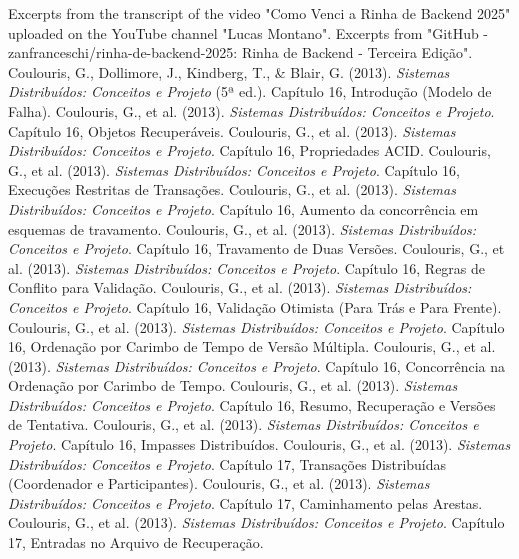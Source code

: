 \documentclass[12pt, a4paper]{article}
\begin{document}
\newpage
\begin{thebibliography}{99}
 Excerpts from the transcript of the video "Como Venci a Rinha de Backend 2025" uploaded on the YouTube channel "Lucas Montano".
 Excerpts from "GitHub - zanfranceschi/rinha-de-backend-2025: Rinha de Backend - Terceira Edição".
 Coulouris, G., Dollimore, J., Kindberg, T., \& Blair, G. (2013). \textit{Sistemas Distribuídos: Conceitos e Projeto} (5ª ed.). Capítulo 16, Introdução (Modelo de Falha).
 Coulouris, G., et al. (2013). \textit{Sistemas Distribuídos: Conceitos e Projeto}. Capítulo 16, Objetos Recuperáveis.
 Coulouris, G., et al. (2013). \textit{Sistemas Distribuídos: Conceitos e Projeto}. Capítulo 16, Propriedades ACID.
 Coulouris, G., et al. (2013). \textit{Sistemas Distribuídos: Conceitos e Projeto}. Capítulo 16, Execuções Restritas de Transações.
 Coulouris, G., et al. (2013). \textit{Sistemas Distribuídos: Conceitos e Projeto}. Capítulo 16, Aumento da concorrência em esquemas de travamento.
 Coulouris, G., et al. (2013). \textit{Sistemas Distribuídos: Conceitos e Projeto}. Capítulo 16, Travamento de Duas Versões.
 Coulouris, G., et al. (2013). \textit{Sistemas Distribuídos: Conceitos e Projeto}. Capítulo 16, Regras de Conflito para Validação.
 Coulouris, G., et al. (2013). \textit{Sistemas Distribuídos: Conceitos e Projeto}. Capítulo 16, Validação Otimista (Para Trás e Para Frente).
 Coulouris, G., et al. (2013). \textit{Sistemas Distribuídos: Conceitos e Projeto}. Capítulo 16, Ordenação por Carimbo de Tempo de Versão Múltipla.
 Coulouris, G., et al. (2013). \textit{Sistemas Distribuídos: Conceitos e Projeto}. Capítulo 16, Concorrência na Ordenação por Carimbo de Tempo.
 Coulouris, G., et al. (2013). \textit{Sistemas Distribuídos: Conceitos e Projeto}. Capítulo 16, Resumo, Recuperação e Versões de Tentativa.
 Coulouris, G., et al. (2013). \textit{Sistemas Distribuídos: Conceitos e Projeto}. Capítulo 16, Impasses Distribuídos.
 Coulouris, G., et al. (2013). \textit{Sistemas Distribuídos: Conceitos e Projeto}. Capítulo 17, Transações Distribuídas (Coordenador e Participantes).
 Coulouris, G., et al. (2013). \textit{Sistemas Distribuídos: Conceitos e Projeto}. Capítulo 17, Caminhamento pelas Arestas.
 Coulouris, G., et al. (2013). \textit{Sistemas Distribuídos: Conceitos e Projeto}. Capítulo 17, Entradas no Arquivo de Recuperação.

\end{thebibliography}
\end{document}
